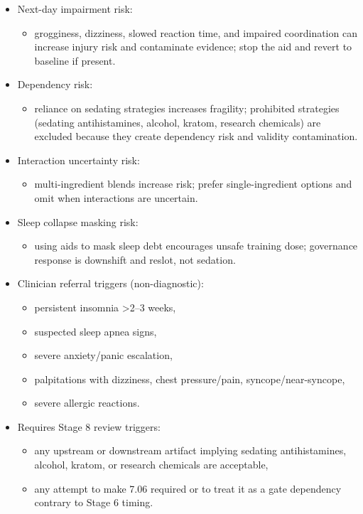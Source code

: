 \documentclass[10pt]{article}
\begin{document}
\begin{itemize}
\item Next-day impairment risk:
  \begin{itemize}
  \item grogginess, dizziness, slowed reaction time, and impaired coordination can increase injury risk and contaminate evidence; stop the aid and revert to baseline if present.
  \end{itemize}
\item Dependency risk:
  \begin{itemize}
  \item reliance on sedating strategies increases fragility; prohibited strategies (sedating antihistamines, alcohol, kratom, research chemicals) are excluded because they create dependency risk and validity contamination.
  \end{itemize}
\item Interaction uncertainty risk:
  \begin{itemize}
  \item multi-ingredient blends increase risk; prefer single-ingredient options and omit when interactions are uncertain.
  \end{itemize}
\item Sleep collapse masking risk:
  \begin{itemize}
  \item using aids to mask sleep debt encourages unsafe training dose; governance response is downshift and reslot, not sedation.
  \end{itemize}
\item Clinician referral triggers (non-diagnostic):
  \begin{itemize}
  \item persistent insomnia >2–3 weeks,
  \item suspected sleep apnea signs,
  \item severe anxiety/panic escalation,
  \item palpitations with dizziness, chest pressure/pain, syncope/near-syncope,
  \item severe allergic reactions.
  \end{itemize}
\item Requires Stage 8 review triggers:
  \begin{itemize}
  \item any upstream or downstream artifact implying sedating antihistamines, alcohol, kratom, or research chemicals are acceptable,
  \item any attempt to make 7.06 required or to treat it as a gate dependency contrary to Stage 6 timing.
  \end{itemize}
\end{itemize}
\end{document}

